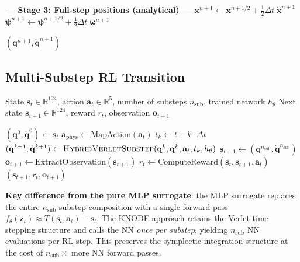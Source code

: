 \documentclass[11pt]{article}
\newcommand{\vect}[1]{\mathbf{#1}}
\newcommand{\Real}{\mathbb{R}}
\begin{document}
\begin{algorithm}[H]
\begin{algorithmic}[1]
\Statex
\Statex \textcolor{physicsblue}{\textbf{--- Stage 3: Full-step positions (analytical) ---}}
\State $\vect{x}^{n+1} \gets \vect{x}^{n+1/2} + \tfrac{1}{2}\Delta t\;\dot{\vect{x}}^{n+1}$
\State $\bm{\psi}^{n+1} \gets \bm{\psi}^{n+1/2} + \tfrac{1}{2}\Delta t\;\bm{\omega}^{n+1}$

\State \Return $(\vect{q}^{n+1}, \dot{\vect{q}}^{n+1})$
\end{algorithmic}
\end{algorithm}


\subsection{Multi-Substep RL Transition}

\begin{algorithm}[H]
\caption{KNODE-Cosserat RL Environment Step}
\label{alg:rl-step}
\begin{algorithmic}[1]
\Require State $\vect{s}_t \in \Real^{124}$, action $\vect{a}_t \in \Real^5$, number of substeps $n_{\text{sub}}$, trained network $h_\theta$
\Ensure Next state $\vect{s}_{t+1} \in \Real^{124}$, reward $r_t$, observation $\vect{o}_{t+1}$

\State $(\vect{q}^0, \dot{\vect{q}}^0) \gets \vect{s}_t$ 
\State $\vect{a}_{\text{phys}} \gets \text{MapAction}(\vect{a}_t)$ 
  \State $t_k \gets t + k \cdot \Delta t$
  \State $(\vect{q}^{k+1}, \dot{\vect{q}}^{k+1}) \gets \textsc{HybridVerletSubstep}(\vect{q}^k, \dot{\vect{q}}^k, \vect{a}_t, t_k, h_\theta)$
\EndFor
\State $\vect{s}_{t+1} \gets (\vect{q}^{n_{\text{sub}}}, \dot{\vect{q}}^{n_{\text{sub}}})$
\State $\vect{o}_{t+1} \gets \text{ExtractObservation}(\vect{s}_{t+1})$ 
\State $r_t \gets \text{ComputeReward}(\vect{s}_t, \vect{s}_{t+1}, \vect{a}_t)$
\State \Return $(\vect{s}_{t+1}, r_t, \vect{o}_{t+1})$
\end{algorithmic}
\end{algorithm}

\noindent
\textbf{Key difference from the pure MLP surrogate}: the MLP surrogate replaces the entire $n_{\text{sub}}$-substep composition with a single forward pass $f_\theta(\vect{z}_t) \approx T(\vect{s}_t, \vect{a}_t) - \vect{s}_t$.
The KNODE approach retains the Verlet time-stepping structure and calls the NN \emph{once per substep}, yielding $n_{\text{sub}}$ NN evaluations per RL step.
This preserves the symplectic integration structure at the cost of $n_{\text{sub}}\times$ more NN forward passes.
\end{document}
